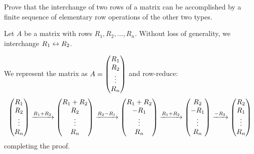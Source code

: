 \begin{xca}
  Prove that the interchange of two rows of a matrix can be accomplished by
  a finite sequence of elementary row operations of the other two types.
\end{xca}
\begin{prf}
  Let $A$ be a matrix with rows $R_1, R_2, \dotsc, R_n$.
  Without loss of generality, we interchange $R_1 \leftrightarrow R_2$.

  We represent the matrix as $A = \mqty(R_1 \\ R_2 \\ \vdots \\ R_n)$ and row-reduce:
  \begin{equation*}
    \mqty(R_1 \\ R_2 \\ \vdots \\ R_n)
    \xto{R_1 + R_2} \mqty(R_1 + R_2 \\ R_2 \\ \vdots \\ R_n)
    \xto{R_2 - R_1} \mqty(R_1 + R_2 \\ -R_1 \\ \vdots \\ R_n)
    \xto{R_1 + R_2} \mqty(R_2 \\ -R_1 \\ \vdots \\ R_n)
    \xto{-R_2} \mqty(R_2 \\ R_1 \\ \vdots \\ R_n)
  \end{equation*}
  completing the proof.
\end{prf}

